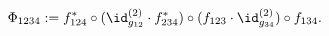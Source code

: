 \begin{equation}
  \Phi_{1234}:=f^\ast_{124}
               \circ (\id^{(2)}_{g_{12}}\cdot f^\ast_{234})
               \circ (f_{123}\cdot\id^{(2)}_{g_{34}})
	       \circ f_{134}.
\end{equation}

